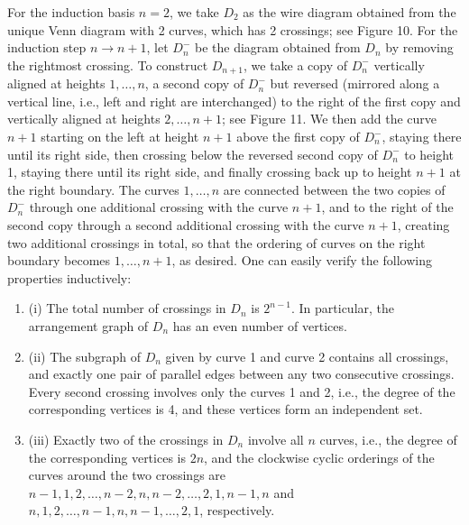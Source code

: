 \documentclass[10pt,a4paper]{article}
\begin{document}
For the induction basis $n=2$, we take $D_{2}$ as the wire diagram obtained from the unique Venn diagram with 2 curves, which has 2 crossings; see Figure 10. For the induction step $n\rightarrow n+1$, let $D_{n}^{-}$ be the diagram obtained from $D_{n}$ by removing the rightmost crossing. To construct $D_{n+1}$, we take a copy of $D_{n}^{-}$ vertically aligned at heights $1,\ldots,n$, a second copy of $D_{n}^{-}$ but reversed (mirrored along a vertical line, i.e., left and right are interchanged) to the right of the first copy and vertically aligned at heights $2,\ldots,n+1$; see Figure 11. We then add the curve $n+1$ starting on the left at height $n+1$ above the first copy of $D_{n}^{-}$, staying there until its right side, then crossing below the reversed second copy of $D_{n}^{-}$ to height 1, staying there until its right side, and finally crossing back up to height $n+1$ at the right boundary. The curves $1,\ldots,n$ are connected between the two copies of $D_{n}^{-}$ through one additional crossing with the curve $n+1$, and to the right of the second copy through a second additional crossing with the curve $n+1$, creating two additional crossings in total, so that the ordering of curves on the right boundary becomes $1,\ldots,n+1$, as desired. One can easily verify the following properties inductively:
\par
\begin{enumerate}
\item[]  (i) 
The total number of crossings in $D_{n}$ is $2^{n-1}$. In particular, the arrangement graph of $D_{n}$ has an even number of vertices.
\par
\par
\item[]  (ii) 
The subgraph of $D_{n}$ given by curve 1 and curve 2 contains all crossings, and exactly one pair of parallel edges between any two consecutive crossings. Every second crossing involves only the curves 1 and 2, i.e., the degree of the corresponding vertices is 4, and these vertices form an independent set.
\par
\par
\item[]  (iii) 
Exactly two of the crossings in $D_{n}$ involve all $n$ curves, i.e., the degree of the corresponding vertices is $2n$, and the clockwise cyclic orderings of the curves around the two crossings are $n-1,1,2,\ldots,n-2,n,n-2,\ldots,2,1,n-1,n$ and $n,1,2,\ldots,n-1,n,n-1,\ldots,2,1$, respectively.
\par
\par
\end{enumerate}
\end{document}

